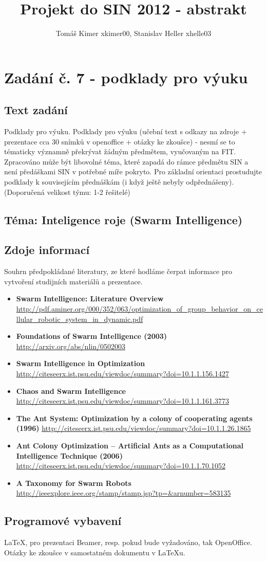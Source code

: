\documentclass[a4paper,12pt]{article}
\title{Projekt do SIN 2012 - abstrakt}
\author{Tomáš Kimer xkimer00, Stanislav Heller xhelle03}
\begin{document}
\maketitle

\section*{Zadání č. 7 - podklady pro výuku}
\vspace{5mm}
\subsection*{Text zadání}
Podklady pro výuku. Podklady pro výuku (učební text s odkazy na zdroje + prezentace cca 30 snímků v openoffice + otázky ke zkoušce) - nesmí se to tématicky významně překrývat žádným předmětem, vyučovaným na FIT. Zpracováno může být libovolné téma, které zapadá do rámce předmětu SIN a není předáškami SIN v potřebné míře pokryto. Pro základní orientaci prostudujte podklady k souvisejícím přednáškám (i když ještě nebyly odpřednášeny). (Doporučená velikost týmu: 1-2 řešitelé)

\subsection*{Téma: Inteligence roje (Swarm Intelligence)}

\subsection*{Zdoje informací}
Souhrn předpokládané literatury, ze které hodláme čerpat informace pro vytvoření studijních materiálů a prezentace.
\begin{itemize}
  \item {\bf Swarm Intelligence: Literature Overview} 
        \url{http://pdf.aminer.org/000/352/063/optimization\_of\_group\_behavior\_on\_cellular\_robotic\_system\_in\_dynamic.pdf}
  \item {\bf Foundations of Swarm Intelligence (2003)}
        \url{http://arxiv.org/abs/nlin/0502003} 
  \item {\bf Swarm Intelligence in Optimization}
        \url{http://citeseerx.ist.psu.edu/viewdoc/summary?doi=10.1.1.156.1427}
  \item {\bf Chaos and Swarm Intelligence}
        \url{http://citeseerx.ist.psu.edu/viewdoc/summary?doi=10.1.1.161.3773}
  \item {\bf The Ant System: Optimization by a colony of cooperating agents (1996)}
        \url{http://citeseerx.ist.psu.edu/viewdoc/summary?doi=10.1.1.26.1865}
  \item {\bf Ant Colony Optimization – Artificial Ants as a Computational Intelligence Technique (2006)}
        \url{http://citeseerx.ist.psu.edu/viewdoc/summary?doi=10.1.1.70.1052}
  \item {\bf A Taxonomy for Swarm Robots}
        \url{http://ieeexplore.ieee.org/stamp/stamp.jsp?tp=&arnumber=583135}
\end{itemize}


\subsection*{Programové vybavení}
\LaTeX{}, pro prezentaci Beamer, resp. pokud bude vyžadováno, tak OpenOffice. Otázky ke zkoušce v samostatném dokumentu v \LaTeX{}u.
\end{document}
